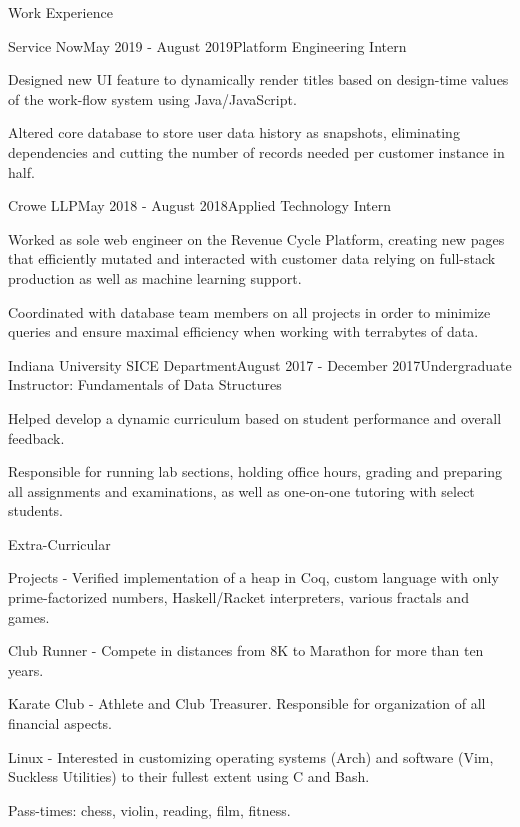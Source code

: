 \documentclass{resume} %
\begin{document}
\begin{rSection}{Work Experience}

	\begin{rSubsection}{Service Now}{May 2019 - August 2019}{Platform Engineering Intern}{}
		\item Designed new UI feature to dynamically render titles based on design-time values of the work-flow system using Java/JavaScript.
		\item Altered core database to store user data history as snapshots, eliminating dependencies and cutting the number of records needed per customer instance in half.
	\end{rSubsection}

	\begin{rSubsection}{Crowe LLP}{May 2018 - August 2018}{Applied Technology Intern}{}
		\item Worked as sole web engineer on the Revenue Cycle Platform, creating new pages that efficiently mutated and interacted with customer data relying on full-stack production as well as machine learning support.
		\item Coordinated with database team members on all projects in order to minimize queries and ensure maximal efficiency when working with terrabytes of data.
	\end{rSubsection}

	\begin{rSubsection}{Indiana University SICE Department}{August 2017 - December 2017}{Undergraduate Instructor: Fundamentals of Data Structures}{}
		\item Helped develop a dynamic curriculum based on student performance and overall feedback.
		\item Responsible for running lab sections, holding office hours, grading and preparing all assignments and examinations, as well as one-on-one tutoring with select students.
	\end{rSubsection}

\end{rSection}

\begin{rSection}{Extra-Curricular} \itemsep -3pt
	\item Projects - Verified implementation of a heap in Coq, custom language with only prime-factorized numbers, Haskell/Racket interpreters, various fractals and games.
	\item Club Runner - Compete in distances from 8K to Marathon for more than ten years.
	\item Karate Club - Athlete and Club Treasurer. Responsible for organization of all financial aspects.
	\item Linux - Interested in customizing operating systems (Arch) and software (Vim, Suckless Utilities) to their fullest extent using C and Bash.
	\item Pass-times: chess, violin, reading, film, fitness.
\end{rSection}
\end{document}
